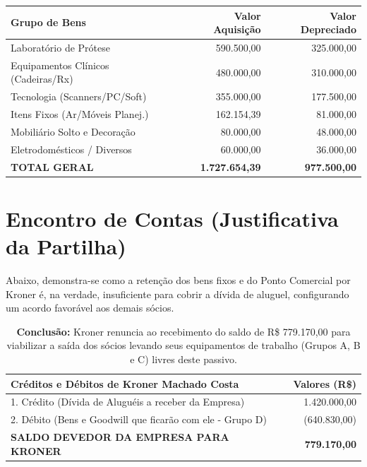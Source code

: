 \documentclass[12pt, a4paper]{article}
\begin{document}
\begin{table}[h!]
    \centering
    \small
    \renewcommand{\arraystretch}{1.2}
    \begin{tabularx}{\textwidth}{X r r}
        \toprule
        \rowcolor{tableHeader} \textbf{Grupo de Bens} & \textbf{Valor Aquisição} & \textbf{Valor Depreciado} \\
        \midrule
        Laboratório de Prótese & 590.500,00 & 325.000,00 \\
        Equipamentos Clínicos (Cadeiras/Rx) & 480.000,00 & 310.000,00 \\
        Tecnologia (Scanners/PC/Soft) & 355.000,00 & 177.500,00 \\
        Itens Fixos (Ar/Móveis Planej.) & 162.154,39 & 81.000,00 \\
        Mobiliário Solto e Decoração & 80.000,00 & 48.000,00 \\
        Eletrodomésticos / Diversos & 60.000,00 & 36.000,00 \\
        \midrule
        \rowcolor{lightGray} \textbf{TOTAL GERAL} & \textbf{1.727.654,39} & \textbf{977.500,00} \\
        \bottomrule
    \end{tabularx}
\end{table}

\section{Encontro de Contas (Justificativa da Partilha)}

Abaixo, demonstra-se como a retenção dos bens fixos e do Ponto Comercial por Kroner é, na verdade, insuficiente para cobrir a dívida de aluguel, configurando um acordo favorável aos demais sócios.

\begin{table}[H]
    \centering
    \begin{tabularx}{\textwidth}{X r}
        \toprule
        \textbf{Créditos e Débitos de Kroner Machado Costa} & \textbf{Valores (R\$)} \\
        \midrule
        1. Crédito (Dívida de Aluguéis a receber da Empresa) & 1.420.000,00 \\
        2. Débito (Bens e Goodwill que ficarão com ele - Grupo D) & (640.830,00) \\
        \midrule
        \textbf{SALDO DEVEDOR DA EMPRESA PARA KRONER} & \textbf{779.170,00} \\
        \bottomrule
    \end{tabularx}
    \caption*{\footnotesize \textbf{Conclusão:} Kroner renuncia ao recebimento do saldo de R\$ 779.170,00 para viabilizar a saída dos sócios levando seus equipamentos de trabalho (Grupos A, B e C) livres deste passivo.}
\end{table}
\end{document}
